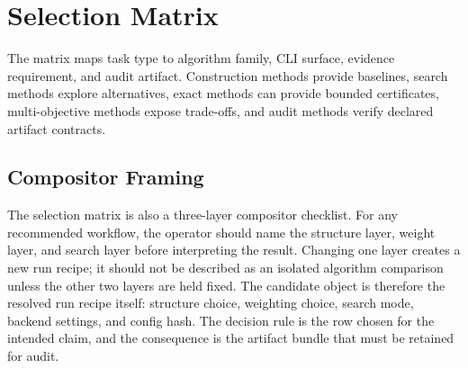 \section{Selection Matrix}

The matrix maps task type to algorithm family, CLI surface, evidence
requirement, and audit artifact. Construction methods provide baselines, search
methods explore alternatives, exact methods can provide bounded certificates,
multi-objective methods expose trade-offs, and audit methods verify declared
artifact contracts.

\subsection*{Compositor Framing}

The selection matrix is also a three-layer compositor checklist.
For any recommended workflow, the operator should name the structure layer,
weight layer, and search layer before interpreting the result.
Changing one layer creates a new run recipe; it should not be described as an
isolated algorithm comparison unless the other two layers are held fixed.
The candidate object is therefore the resolved run recipe itself: structure
choice, weighting choice, search mode, backend settings, and config hash.
The decision rule is the row chosen for the intended claim, and the consequence
is the artifact bundle that must be retained for audit.

\begin{table}[htbp]
\centering
\scriptsize
{}
\caption{Method-family selection by claim need, audit handoff, and claim boundary.}
\end{table}

